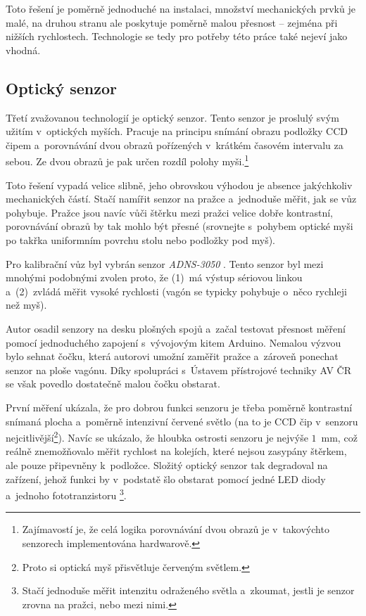 Toto řešení je poměrně jednoduché na instalaci, množství mechanických prvků je
malé, na druhou stranu ale poskytuje poměrně malou přesnost -- zejména při
nižších rychlostech. Technologie  se tedy pro potřeby této
práce také nejeví jako vhodná.

\subsection{Optický senzor}
\label{subsec:wsm-senzor-opto}

Třetí zvažovanou technologií je optický senzor. Tento senzor je proslulý svým
užitím v~optických myších. Pracuje na principu snímání obrazu podložky CCD
čipem a~porovnávání dvou obrazů pořízených v~krátkém časovém intervalu za
sebou. Ze dvou obrazů je pak určen rozdíl polohy myši.\footnote{Zajímavostí
je, že celá logika porovnávání dvou obrazů je v~takovýchto senzorech
implementována hardwarově.}

Toto řešení vypadá velice slibně, jeho obrovskou výhodou je absence jakýchkoliv
mechanických částí. Stačí namířit senzor na pražce a~jednoduše měřit, jak se vůz
pohybuje. Pražce jsou navíc vůči štěrku mezi pražci velice dobře kontrastní,
porovnávání obrazů by tak mohlo být přesné (srovnejte s~pohybem optické
myši po takřka uniformním povrchu stolu nebo podložky pod myš).

Pro kalibrační vůz byl vybrán senzor \textit{ADNS-3050} \cite{adns-3050}.
Tento senzor byl mezi mnohými podobnými zvolen proto, že (1)~má výstup sériovou
linkou a~(2)~zvládá měřit vysoké rychlosti (vagón se typicky pohybuje o~něco
rychleji než myš).

Autor osadil senzory na desku plošných spojů a~začal testovat přesnost měření
pomocí jednoduchého zapojení s~vývojovým kitem Arduino. Nemalou výzvou bylo
sehnat čočku, která autorovi umožní zaměřit pražce a~zároveň ponechat senzor na
ploše vagónu. Díky spolupráci s~Ústavem přístrojové techniky AV ČR se však
povedlo dostatečně malou čočku obstarat.

První měření ukázala, že pro dobrou funkci senzoru je třeba poměrně kontrastní
snímaná plocha a~poměrně intenzivní červené světlo (na to je CCD čip v~senzoru
nejcitlivější\footnote{Proto si optická myš přisvětluje červeným světlem.}).
Navíc se ukázalo, že hloubka ostrosti senzoru je nejvýše $1$~mm, což reálně
znemožňovalo měřit rychlost na kolejích, které nejsou zasypány štěrkem, ale
pouze připevněny k~podložce. Složitý optický senzor tak degradoval na zařízení,
jehož funkci by v~podstatě šlo obstarat pomocí jedné LED diody a~jednoho
fototranzistoru \footnote{Stačí jednoduše měřit intenzitu odraženého světla
a~zkoumat, jestli je senzor zrovna na pražci, nebo mezi nimi.}.

